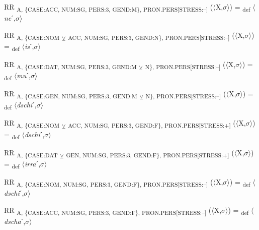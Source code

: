 {\begin{exe}
 RR \textsubscript{A, \{CASE:ACC, NUM:SG, PERS:3, GEND:M\}, PRON.PERS[STRESS:–]} ($\langle$X,$\sigma $$\rangle$) = \textsubscript{def} $\langle$\textit{ne}ˊ,$\sigma $$\rangle$
\end{exe}

\begin{exe}
 RR \textsubscript{A, \{CASE:NOM} \textsubscript{${\veebar}$}\textsubscript{ ACC, NUM:SG, PERS:3, GEND:N\}, PRON.PERS[STRESS:–]} ($\langle$X,$\sigma $$\rangle$) = \textsubscript{def} $\langle$\textit{is}ˊ,$\sigma $$\rangle$
\end{exe}

\begin{exe}
 RR \textsubscript{A, \{CASE:DAT, NUM:SG, PERS:3, GEND:M} \textsubscript{${\veebar}$}\textsubscript{ N\}, PRON.PERS[STRESS:–]} ($\langle$X,$\sigma $$\rangle$) = \textsubscript{def} $\langle$\textit{mu}ˊ,$\sigma $$\rangle$
\end{exe}

\begin{exe}
 RR \textsubscript{A, \{CASE:GEN, NUM:SG, PERS:3, GEND:M} \textsubscript{${\veebar}$}\textsubscript{ N\}, PRON.PERS[STRESS:–]} ($\langle$X,$\sigma $$\rangle$) = \textsubscript{def} $\langle$\textit{dschi}ˊ,$\sigma $$\rangle$
\end{exe}

\begin{exe}
 RR \textsubscript{A, \{CASE:NOM} \textsubscript{${\veebar}$}\textsubscript{ ACC, NUM:SG, PERS:3, GEND:F\}, PRON.PERS[STRESS:+]} ($\langle$X,$\sigma $$\rangle$) = \textsubscript{def} $\langle$\textit{dschi}ˊ,$\sigma $$\rangle$
\end{exe}

\begin{exe}
 RR \textsubscript{A, \{CASE:DAT} \textsubscript{${\veebar}$}\textsubscript{ GEN, NUM:SG, PERS:3, GEND:F\}, PRON.PERS[STRESS:+]} ($\langle$X,$\sigma $$\rangle$) = \textsubscript{def} $\langle$\textit{irra}ˊ,$\sigma $$\rangle$
\end{exe}

\begin{exe}
 RR \textsubscript{A, \{CASE:NOM, NUM:SG, PERS:3, GEND:F\}, PRON.PERS[STRESS:–]} ($\langle$X,$\sigma $$\rangle$) = \textsubscript{def} $\langle$\textit{dschi}ˊ,$\sigma $$\rangle$
\end{exe}

\begin{exe}
 RR \textsubscript{A, \{CASE:ACC, NUM:SG, PERS:3, GEND:F\}, PRON.PERS[STRESS:–]} ($\langle$X,$\sigma $$\rangle$) = \textsubscript{def} $\langle$\textit{dscha}ˊ,$\sigma $$\rangle$
\end{exe}

}
